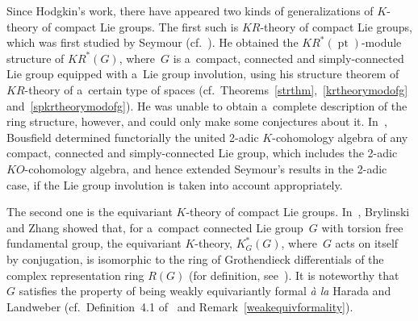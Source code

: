 \documentclass[pdftex]{sigma}
\numberwithin{equation}{section}
\DeclareMathOperator{\pt}{pt}
\begin{document}
Since Hodgkin's work, there have appeared two kinds of generalizations of $K$-theory of compact Lie groups.
The f\/irst such is $KR$-theory of compact Lie groups, which was f\/irst studied by Seymour (cf.~\cite{Se}).
He obtained the $KR^*(\pt)$-module structure of $KR^*(G)$, where~$G$ is a~compact, connected and simply-connected
Lie group equipped with a~Lie group involution, using his structure theorem of $KR$-theory
of a~certain type of spaces
(cf.\ Theorems~\ref{strthm},~\ref{krtheorymodofg} and~\ref{spkrtheorymodofg}).
He was unable to obtain a~complete description of the ring structure, however, and could only make some conjectures
about it.
In~\cite{Bo}, Bousf\/ield determined functorially the united 2-adic $K$-cohomology algebra of any compact, connected and
simply-connected Lie group, which includes the 2-adic $KO$-cohomology algebra, and hence extended Seymour's results in
the 2-adic case, if the Lie group involution is taken into account appropriately.

The second one is the equivariant $K$-theory of compact Lie groups.
In~\cite{BZ}, Brylinski and Zhang showed that, for a~compact connected Lie group~$G$ with torsion free fundamental
group, the equivariant $K$-theory, $K_G^*(G)$, where~$G$ acts on itself by conjugation, is isomorphic to the ring of
Grothendieck dif\/ferentials of the complex representation ring $R(G)$ (for def\/inition, see~\cite{BZ}).
It is noteworthy that~$G$ satisf\/ies the property of being weakly equivariantly formal \emph{\`a la} Harada and Landweber
(cf.\ Def\/inition~4.1 of~\cite{HL} and Remark~\ref{weakequivformality}).
\end{document}
